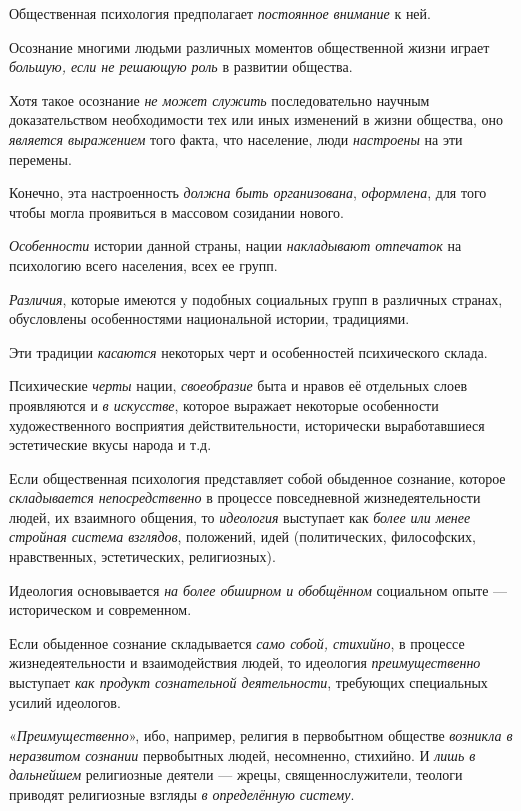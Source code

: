 \documentclass[a4paper,14pt,russian]{extreport}
\begin{document}
Общественная психология предполагает \emph{постоянное внимание} к ней.

Осознание многими людьми различных моментов общественной жизни играет \emph{большую, если не решающую роль} в развитии общества.

Хотя такое осознание \emph{не может служить} последовательно научным доказательством необходимости тех или иных изменений в жизни общества, оно \emph{является выражением} того факта, что население, люди \emph{настроены} на эти перемены.

Конечно, эта настроенность \emph{должна быть организована}, \emph{оформлена}, для того чтобы могла проявиться в массовом созидании нового.

\emph{Особенности} истории данной страны, нации \emph{накладывают отпечаток} на психологию всего населения, всех ее групп.

\emph{Различия}, которые имеются у подобных социальных групп в различных странах, обусловлены особенностями национальной истории, традициями.

Эти традиции \emph{касаются} некоторых черт и особенностей психического склада.

Психические \emph{черты} нации, \emph{своеобразие} быта и нравов её отдельных слоев проявляются и \emph{в искусстве}, которое выражает некоторые особенности художественного восприятия действительности, исторически выработавшиеся эстетические вкусы народа и т.д.

Если общественная психология представляет собой обыденное сознание, которое \emph{складывается непосредственно} в процессе повседневной жизнедеятельности людей, их взаимного общения, то \emph{идеология} выступает как \emph{более или менее стройная система взглядов}, положений, идей (политических, философских, нравственных, эстетических, религиозных).

Идеология основывается \emph{на более обширном и обобщённом} социальном опыте --- историческом и современном.

Если обыденное сознание складывается \emph{само собой, стихийно}, в процессе жизнедеятельности и взаимодействия людей, то идеология \emph{преимущественно} выступает \emph{как продукт сознательной деятельности}, требующих специальных усилий идеологов.

«\emph{Преимущественно}», ибо, например, религия в первобытном обществе \emph{возникла в неразвитом сознании} первобытных людей, несомненно, стихийно. И \emph{лишь в дальнейшем} религиозные деятели --- жрецы, священнослужители, теологи приводят религиозные взгляды \emph{в определённую систему}.
\end{document}

